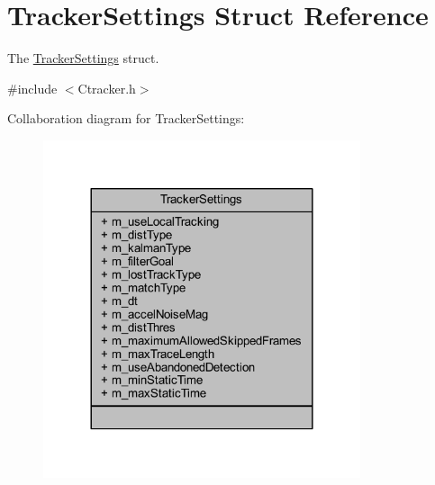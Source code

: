 \hypertarget{struct_tracker_settings}{}\section{Tracker\+Settings Struct Reference}
\label{struct_tracker_settings}


The \mbox{\hyperlink{struct_tracker_settings}{Tracker\+Settings}} struct.  




{\ttfamily \#include $<$Ctracker.\+h$>$}



Collaboration diagram for Tracker\+Settings\+:\nopagebreak
\begin{figure}[H]
\begin{center}
\leavevmode
\includegraphics[width=264pt]{struct_tracker_settings__coll__graph}
\end{center}
\end{figure}
